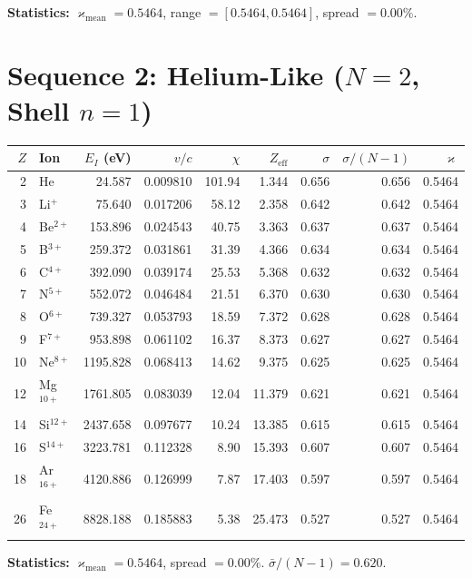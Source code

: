 \documentclass{article}
\newcommand{\kop}{\varkappa}
\begin{document}
\textbf{Statistics:} $\kop_{\text{mean}} = 0.5464$, range $= [0.5464, 0.5464]$, spread $= 0.00\%$.


\section{Sequence 2: Helium-Like ($N = 2$, Shell $n = 1$)}

\begin{center}
\small
\begin{tabular}{rlrrrrrrr}
\toprule
$Z$ & Ion & $E_I$ (eV) & $v/c$ & $\chi$ & $Z_{\text{eff}}$ & $\sigma$ & $\sigma/(N{-}1)$ & $\kop$ \\
\midrule
 2 & He          &   24.587 & 0.009810 & 101.94 & 1.344 & 0.656 & 0.656 & 0.5464 \\
 3 & Li$^+$      &   75.640 & 0.017206 &  58.12 & 2.358 & 0.642 & 0.642 & 0.5464 \\
 4 & Be$^{2+}$   &  153.896 & 0.024543 &  40.75 & 3.363 & 0.637 & 0.637 & 0.5464 \\
 5 & B$^{3+}$    &  259.372 & 0.031861 &  31.39 & 4.366 & 0.634 & 0.634 & 0.5464 \\
 6 & C$^{4+}$    &  392.090 & 0.039174 &  25.53 & 5.368 & 0.632 & 0.632 & 0.5464 \\
 7 & N$^{5+}$    &  552.072 & 0.046484 &  21.51 & 6.370 & 0.630 & 0.630 & 0.5464 \\
 8 & O$^{6+}$    &  739.327 & 0.053793 &  18.59 & 7.372 & 0.628 & 0.628 & 0.5464 \\
 9 & F$^{7+}$    &  953.898 & 0.061102 &  16.37 & 8.373 & 0.627 & 0.627 & 0.5464 \\
10 & Ne$^{8+}$   & 1195.828 & 0.068413 &  14.62 & 9.375 & 0.625 & 0.625 & 0.5464 \\
12 & Mg$^{10+}$  & 1761.805 & 0.083039 &  12.04 &11.379 & 0.621 & 0.621 & 0.5464 \\
14 & Si$^{12+}$  & 2437.658 & 0.097677 &  10.24 &13.385 & 0.615 & 0.615 & 0.5464 \\
16 & S$^{14+}$   & 3223.781 & 0.112328 &   8.90 &15.393 & 0.607 & 0.607 & 0.5464 \\
18 & Ar$^{16+}$  & 4120.886 & 0.126999 &   7.87 &17.403 & 0.597 & 0.597 & 0.5464 \\
26 & Fe$^{24+}$  & 8828.188 & 0.185883 &   5.38 &25.473 & 0.527 & 0.527 & 0.5464 \\
\bottomrule
\end{tabular}
\end{center}

\textbf{Statistics:} $\kop_{\text{mean}} = 0.5464$, spread $= 0.00\%$.  $\bar{\sigma}/(N{-}1) = 0.620$.
\end{document}
